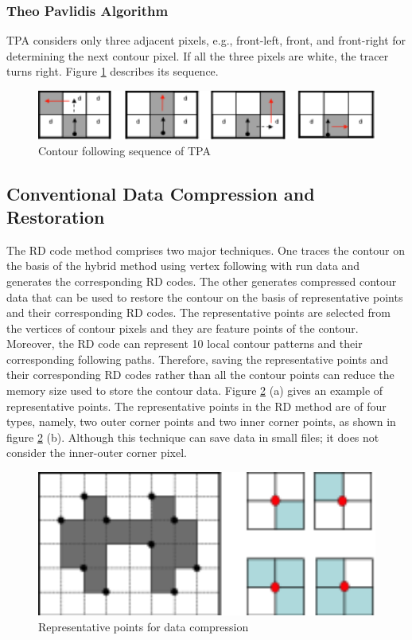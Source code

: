 \subsubsection{Theo Pavlidis Algorithm}
TPA \cite{Pavlidis2012Algorithms} considers only three adjacent pixels, e.g., front-left, front, and front-right for determining the next contour pixel. If all the three pixels are white, the tracer turns right. Figure \ref{fig:tpa} describes its sequence. 
\begin{figure}[htbp]
	\centering
	\includegraphics[width=1.0\textwidth]{2.RelatedWorks/tpa.png}
	\caption{Contour following sequence of TPA \cite{Cheong2006Advanced}}
	\label{fig:tpa}
\end{figure}




\subsection{Conventional Data Compression and Restoration}
The RD code method \cite{Miyatake1997Contour} comprises two major techniques. One traces the contour on the basis of the hybrid method using vertex following with run data and generates the corresponding RD codes. The other generates compressed contour data that can be used to restore the contour on the basis of representative points and their corresponding RD codes. The representative points are selected from the vertices of contour pixels and they are feature points of the contour. Moreover, the RD code can represent 10 local contour patterns and their corresponding following paths. Therefore, saving the representative points and their corresponding RD codes rather than all the contour points can reduce the memory size used to store the contour data. Figure \ref{fig:rdcode} (a) \cite{Miyatake1997Contour} gives an example of representative points. The representative points in the RD method are of four types, namely, two outer corner points and two inner corner points, as shown in figure \ref{fig:rdcode} (b). Although this technique can save data in small files; it does not consider the inner-outer corner pixel. 

\begin{figure}[htbp]
	\centering
	\includegraphics[width=1.0\textwidth]{2.RelatedWorks/rdcode.png}
	\caption{Representative points for data compression}
	\label{fig:rdcode}
\end{figure}